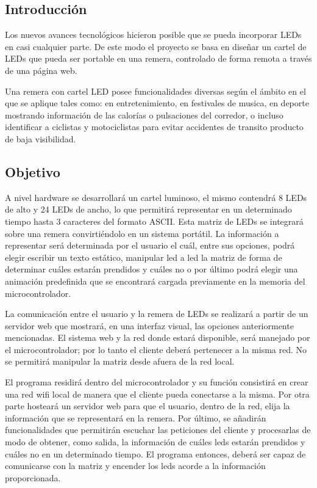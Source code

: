 \subsection{Introducción}
Los nuevos avances tecnológicos hicieron posible que se pueda incorporar LEDs en casi cualquier parte. De este modo el proyecto se basa en diseñar un cartel de LEDs que pueda ser portable en una remera, controlado de forma remota a través de una página web.

Una remera con cartel LED posee funcionalidades diversas según el ámbito en el que se aplique tales como: en entretenimiento, en festivales de musica, en deporte mostrando información de las calorías o pulsaciones del corredor, o incluso identificar a ciclistas y motociclistas para evitar accidentes de transito producto de baja visibilidad.

\subsection{Objetivo}
A nivel hardware se desarrollará un cartel luminoso, el mismo contendrá 8 LEDs de alto y 24 LEDs de ancho, lo que permitirá representar en un determinado tiempo hasta 3 caracteres del formato ASCII. Esta matriz de LEDs se integrará sobre una remera convirtiéndolo en un sistema portátil. La información a representar será determinada por el usuario el cuál, entre sus opciones, podrá elegir escribir un texto estático, manipular led a led la matriz de forma de determinar cuáles estarán prendidos y cuáles no o por último podrá elegir una animación predefinida que se encontrará cargada previamente en la memoria del microcontrolador. 

La comunicación entre el usuario y la remera de LEDs se realizará a partir de un servidor web que mostrará, en una interfaz visual, las opciones anteriormente mencionadas. El sistema web y la red donde estará disponible, será manejado por el microcontrolador; por lo tanto el cliente deberá pertenecer a la misma red. No se permitirá manipular la matriz desde afuera de la red local.

El programa residirá dentro del microcontrolador y su función consistirá en crear una red wifi local de manera que el cliente pueda conectarse a la misma. Por otra parte hosteará un servidor web para que el usuario, dentro de la red, elija la información que se representará en la remera. Por último, se añadirán funcionalidades que permitirán escuchar las peticiones del cliente y procesarlas de modo de obtener, como salida, la información de cuáles leds estarán prendidos y cuáles no en un determinado tiempo. El programa entonces, deberá ser capaz de comunicarse con la matriz y encender los leds acorde a la información proporcionada.

